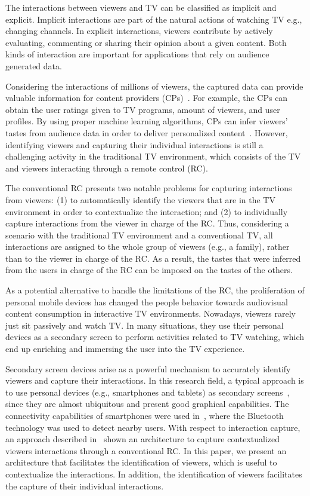 \documentclass[conference,a4paper]{IEEEtran}
\begin{document}
The interactions between viewers and TV can be classified as implicit and explicit. Implicit interactions are part of the natural actions of watching TV e.g., changing channels. In explicit interactions, viewers contribute by actively evaluating, commenting or sharing their opinion about a given content. Both kinds of interaction are important for applications that rely on audience generated data.

Considering the interactions of millions of viewers, the captured data can provide valuable information for content providers (CPs)~\cite{Teixeira2010}. For example, the CPs can obtain the user ratings given to TV programs, amount of viewers, and user profiles. By using proper machine learning algorithms, CPs can infer viewers' tastes from audience data in order to deliver personalized content~\cite{Kim2012,Shin2009}. However, identifying viewers and capturing their individual interactions is still a challenging activity in the traditional TV environment, which consists of the TV and viewers interacting through a remote control (RC).

The conventional RC presents two notable problems for capturing interactions from viewers: (1) to automatically identify the viewers that are in the TV environment in order to contextualize the interaction; and (2) to individually capture interactions from the viewer in charge of the RC. Thus, considering a scenario with the traditional TV environment and a conventional TV, all interactions are assigned to the whole group of viewers (e.g., a family), rather than to the viewer in charge of the RC. As a result, the tastes that were inferred from the users in charge of the RC can be imposed on the tastes of the others.

As a potential alternative to handle the limitations of the RC, the proliferation of personal mobile devices has changed the people behavior towards audiovisual content consumption in interactive TV environments. Nowadays, viewers rarely just sit passively and watch TV. In many situations, they use their personal devices as a secondary screen to perform activities related to TV watching, which end up enriching and immersing the user into the TV experience. 

Secondary screen devices arise as a powerful mechanism to accurately identify viewers and  capture their interactions. In this research field, a typical approach is to use personal devices (e.g., smartphones and tablets) as secondary screens~\cite{Courtois2012}, since they are almost ubiquitous and present good graphical capabilities. The connectivity capabilities of smartphones were used in~\cite{Cabarcos2011}, where the Bluetooth technology was used to detect nearby users. With respect to interaction capture, an approach described in~\cite{Teixeira2010} shown an architecture to capture contextualized viewers interactions through a conventional RC. In this paper, we present an architecture that facilitates the identification of viewers, which is useful to contextualize the interactions. In addition, the identification of viewers facilitates the capture of their individual interactions.
\end{document}
